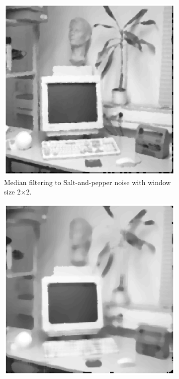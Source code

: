 \documentclass[11pt,a4paper]{article}
\begin{document}
\begin{itemize}
\begin{figure}[!ht]
		\begin{subfigure}[t]{.32\linewidth} %
			\includegraphics[width=\columnwidth]{Q17_Med_to_Sap_2_2.eps}
			\caption{\scriptsize Median filtering to Salt-and-pepper noise with window size 2$\times$2.}
			\label{fig:medToSap2*2}
		\end{subfigure}
		\begin{subfigure}[t]{.32\linewidth} %
			\includegraphics[width=\columnwidth]{Q17_Med_to_Sap_3_3.eps}

\end{subfigure}
\end{figure}
\end{itemize}
\end{document}
